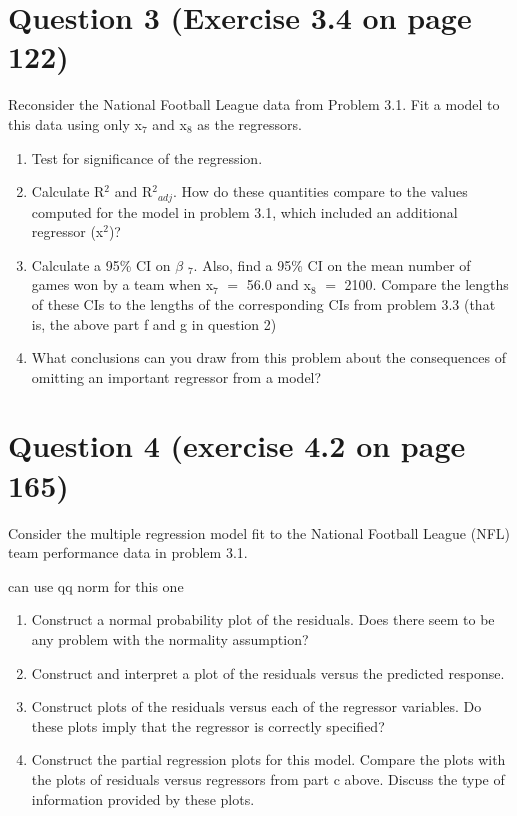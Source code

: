 \documentclass{article}
\newcommand{\mt}[1]{\ensuremath{#1}}
\newcommand\bsc[2][\DefaultOpt]{%
  \def\DefaultOpt{#2}%
  \section[#1]{#2}%
}
\newcommand{\balist}{\begin{enumerate}[label=\alph*.]}
\newcommand{\elist}{\end{enumerate}}
\newcommand{\bta}{\mt{\beta} }
\newcommand{\eql}{ \mt{\operatorname{=}} }
\newcommand{\uw}[2]{#1\mt{_{#2}}}
\newcommand{\uf}[2]{#1\mt{^{#2}}}
\begin{document}
\bsc{Question 3 (Exercise 3.4 on page 122)}{
Reconsider the National Football League data from Problem 3.1. Fit a model to this data using only \uw{x}{7} and \uw{x}{8} as the regressors.
\balist
\item Test for significance of the regression.
\item Calculate \uf{R}{2} and \uw{\uf{R}{2}}{adj}. How do these quantities compare to the values computed for the model in problem 3.1, which included an additional regressor (\uf{x}{2})?
\item Calculate a 95\% CI on \uw{\bta}{7}. Also, find a 95\% CI on the mean number of games won by a team when \uw{x}{7} \eql 56.0 and \uw{x}{8} \eql 2100. Compare the lengths of these CIs to the lengths of the corresponding CIs from problem 3.3 (that is, the above part f and g in question 2)
\item What conclusions can you draw from this problem about the consequences of omitting an important regressor from a model?
\elist

}

\bsc{Question 4 (exercise 4.2 on page 165)}{
Consider the multiple regression model fit to the National Football League (NFL) team performance data in problem 3.1.

can use qq norm for this one

\balist
\item Construct a normal probability plot of the residuals. Does there seem to be any problem with the normality assumption?
\item Construct and interpret a plot of the residuals versus the predicted response.
\item Construct plots of the residuals versus each of the regressor variables. Do these plots imply that the regressor is correctly specified?
\item Construct the partial regression plots for this model. Compare the plots with the plots of residuals versus regressors from part c above. Discuss the type of information provided by these plots.
\elist
}
\end{document}
